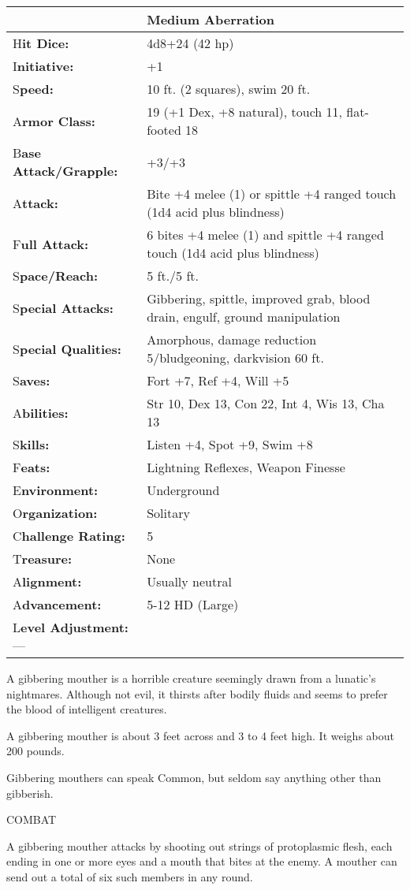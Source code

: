 \documentclass{article}
\begin{document}
\begin{tabular}{|>{\raggedright}p{88pt}|>{\raggedright}p{238pt}|}
\hline
  & Medium Aberration\tabularnewline
\hline
H\textbf{it Dice:} & 4d8+24 (42 hp)\tabularnewline
\hline
I\textbf{nitiative:} & +1\tabularnewline
\hline
S\textbf{peed:} & 10 ft. (2 squares), swim 20 ft.\tabularnewline
\hline
A\textbf{rmor Class:} & 19 (+1 Dex, +8 natural), touch 11, flat-footed 18\tabularnewline
\hline
B\textbf{ase Attack/Grapple:} & +3/+3\tabularnewline
\hline
A\textbf{ttack:} & Bite +4 melee (1) or spittle +4 ranged touch (1d4 acid plus 
blindness)\tabularnewline
\hline
F\textbf{ull Attack:} & 6 bites +4 melee (1) and spittle +4 ranged touch (1d4 acid 
plus blindness)\tabularnewline
\hline
S\textbf{pace/Reach:} & 5 ft./5 ft.\tabularnewline
\hline
S\textbf{pecial Attacks:} & Gibbering, spittle, improved grab, blood drain, engulf, 
ground manipulation\tabularnewline
\hline
S\textbf{pecial Qualities:} & Amorphous, damage reduction 5/bludgeoning, darkvision 
60 ft.\tabularnewline
\hline
S\textbf{aves:} & Fort +7, Ref +4, Will +5\tabularnewline
\hline
A\textbf{bilities:} & Str 10, Dex 13, Con 22, Int 4, Wis 13, Cha 13\tabularnewline
\hline
S\textbf{kills:} & Listen +4, Spot +9, Swim +8\tabularnewline
\hline
F\textbf{eats:} & Lightning Reflexes, Weapon Finesse\tabularnewline
\hline
E\textbf{nvironment:} & Underground\tabularnewline
\hline
O\textbf{rganization:} & Solitary\tabularnewline
\hline
C\textbf{hallenge Rating:} & 5\tabularnewline
\hline
T\textbf{reasure:} & None\tabularnewline
\hline
A\textbf{lignment:} & Usually neutral\tabularnewline
\hline
A\textbf{dvancement:} & 5-12 HD (Large)\tabularnewline
\hline
L\textbf{evel Adjustment:}--- & \tabularnewline
\hline
\end{tabular}

A gibbering mouther is a horrible creature seemingly drawn from a lunatic's nightmares. 
Although not evil, it thirsts after bodily fluids and seems to prefer the blood 
of intelligent creatures.

A gibbering mouther is about 3 feet across and 3 to 4 feet high. It weighs about 
200 pounds.

Gibbering mouthers can speak Common, but seldom say anything other than gibberish.

COMBAT

A gibbering mouther attacks by shooting out strings of protoplasmic flesh, each 
ending in one or more eyes and a mouth that bites at the enemy. A mouther can send 
out a total of six such members in any round.
\end{document}
